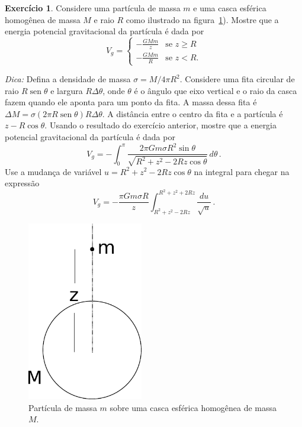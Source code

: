 \documentclass[twocolumn=on,fontsize=12pt,DIV=calc]{scrartcl}
\theoremstyle{definition}
\newtheorem{ex}{Exercício}[section]
\DeclareMathOperator{\sen}{sen}
\begin{document}
\begin{ex}
  \label{ex:potencial.casca}
  Considere uma partícula de massa $m$ e uma casca esférica homogênea
  de massa $M$ e raio $R$ como ilustrado na
  figura~\ref{fig:potencial_esfera}). Mostre que a energia potencial
  gravitacional da partícula é dada por
  $$V_g=
  \begin{cases}
    -\frac{GMm}{z}&\text{se $z\ge R$}\\
    -\frac{GMm}{R}&\text{se $z<R$.}
  \end{cases}
  $$

  \noindent\textit{Dica:} Defina a densidade de massa
  $\sigma=M/4\pi R^2$. Considere uma fita circular de raio
  $R\sen\theta$ e largura $R\Delta\theta$, onde $\theta$ é o ângulo
  que eixo vertical e o raio da casca fazem quando ele aponta para um
  ponto da fita. A massa dessa fita é
  $\Delta M=\sigma(2\pi R\sen\theta)R\Delta\theta$. A distância entre
  o centro da fita e a partícula é $z-R\cos\theta$. Usando o resultado
  do exercício anterior, mostre que a energia potencial gravitacional
  da partícula é dada por
  $$V_g=-\int_0^{\pi}\frac{2\pi Gm\sigma R^2\sin\theta}{\sqrt{R^2+z^2-2Rz\cos\theta}}\,d\theta\,.$$
  Use a mudança de variável $u=R^2+z^2-2Rz\cos\theta$ na integral para
  chegar na expressão
  $$V_g=-\frac{\pi Gm\sigma R}{z}\int_{R^2+z^2-2Rz}^{R^2+z^2+2Rz}\frac{du}{\sqrt{u}}\,.$$
  \begin{figure}[ht]
    \centering
    \includegraphics[width=0.45\textwidth,keepaspectratio]{aux/potencial_esfera.pdf}
    \caption{Partícula de massa $m$ sobre uma casca esférica homogênea
      de massa $M$.}
    \label{fig:potencial_esfera}
  \end{figure}
\end{ex}
\end{document}
